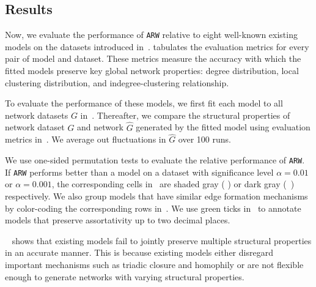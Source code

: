 \subsection{Results}
\label{sub:Experimental Results}

Now, we evaluate the performance of \texttt{ARW} relative to eight well-known
existing models on the datasets introduced in~.
 tabulates the evaluation metrics for every pair of model
and dataset. These metrics measure the accuracy with which the fitted models
preserve key global network properties: degree distribution, local clustering distribution,
and indegree-clustering relationship.

To evaluate the performance of these models, we first fit each model
to all network datasets $G$ in~.
Thereafter, we compare the structural properties of network dataset $G$ and network $\hat{G}$
generated by the fitted model using evaluation metrics in~. We average out
fluctuations in $\hat{G}$ over 100 runs.

We use one-sided permutation tests \cite{good2013permutation} to evaluate the relative
performance of \texttt{ARW}. If \texttt{ARW} performs better than a model on a dataset
with significance level $\alpha=0.01$ or $\alpha=0.001$, the corresponding cells in~
are shaded gray ( \lightgraybg{ }) or dark gray (~\darkgraybg{ }) respectively.
We also group models that have similar edge formation mechanisms by color-coding the
corresponding rows in~.  We use green ticks in~ to
annotate models that preserve assortativity up to two decimal places.


~ shows that existing models fail to jointly preserve
{multiple} structural properties in an accurate manner. This is because existing
models either disregard important mechanisms such as triadic closure and homophily
or are not flexible enough to generate networks with varying structural properties.

